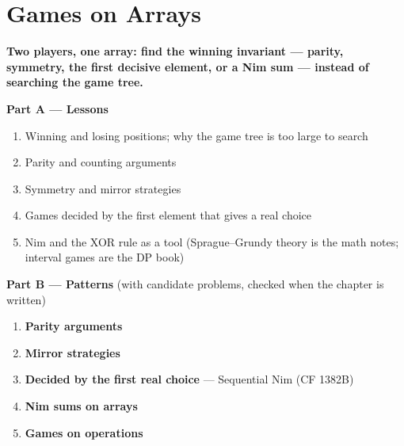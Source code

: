 \chapter{Games on Arrays}
\label{ch:games}

\begin{tcolorbox}[enhanced, colback=white, colframe=secondaryblue, boxrule=1pt, arc=2mm]
\textbf{\large\textcolor{primaryblue}{Two players, one array: find the winning invariant --- parity, symmetry, the first decisive element, or a Nim sum --- instead of searching the game tree.}}
\end{tcolorbox}


\begin{plannedbox}
\textbf{Part A --- Lessons}
\begin{enumerate}[leftmargin=*, label=\textbf{A\arabic*.}, itemsep=1pt]
    \item Winning and losing positions; why the game tree is too large to search
    \item Parity and counting arguments
    \item Symmetry and mirror strategies
    \item Games decided by the first element that gives a real choice
    \item Nim and the XOR rule as a tool (Sprague--Grundy theory is the math notes; interval games are the DP book)
\end{enumerate}
\textbf{Part B --- Patterns} (with candidate problems, checked when the chapter is written)
\begin{enumerate}[leftmargin=*, label=\textbf{P\arabic*.}, itemsep=1pt]
    \item \textbf{Parity arguments}
    \item \textbf{Mirror strategies}
    \item \textbf{Decided by the first real choice} --- Sequential Nim {\small\color{darkgray}(CF 1382B)}
    \item \textbf{Nim sums on arrays}
    \item \textbf{Games on operations}
\end{enumerate}
\end{plannedbox}
